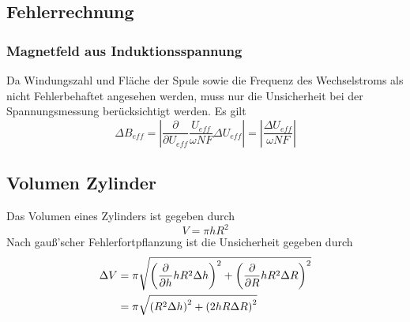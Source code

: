 \subsection{Fehlerrechnung}
\subsubsection{Magnetfeld aus Induktionsspannung}
Da Windungszahl und Fläche der Spule sowie die Frequenz des Wechselstroms als nicht Fehlerbehaftet angesehen werden, muss nur die Unsicherheit bei der Spannungsmessung berücksichtigt werden. Es gilt 
\begin{equation}
	\Delta B_{eff} = \left|\frac{\partial }{\partial U_{eff}} \frac{U_{eff}}{\omega NF} \Delta U_{eff}\right| = \left|\frac{\Delta U_{eff}}{\omega N F}\right|
\end{equation}

\subsection{Volumen Zylinder}
Das Volumen eines Zylinders ist gegeben durch \begin{equation*}
	V = \pi h R^2
\end{equation*}
Nach gauß'scher Fehlerfortpflanzung ist die Unsicherheit gegeben durch
\begin{align}
	\Delta V &= \pi \sqrt{\left(\frac{\partial}{\partial h} h R^2 \Delta h\right)^2 + \left( \frac{\partial}{\partial R} hR^2 \Delta R\right)^2} \notag \\
	&= \pi \sqrt{\left(R^2 \Delta h\right)^2 + \left(  2hR \Delta R\right)^2} \label{eq:zylinderErr}
\end{align}